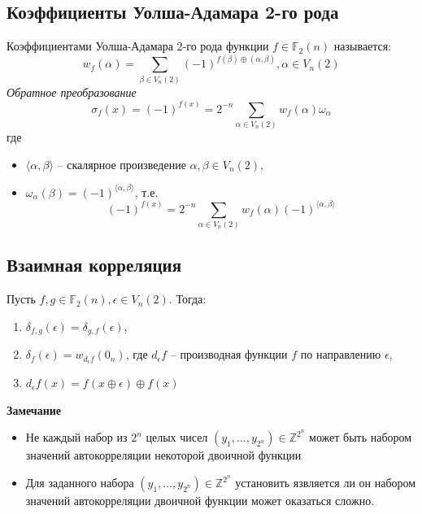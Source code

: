 \documentclass[a4paper,12pt]{article}
\begin{document}
        \subsection{Коэффициенты Уолша-Адамара 2-го рода}
        Коэффициентами Уолша-Адамара 2-го рода функции $f \in
        \mathbb{F}_2(n)$ называется: \[ w_f(\alpha) = \sum_{\beta \in
            V_n(2)} (-1)^{f(\beta) \oplus (\alpha, \beta)},
          \alpha \in V_n(2) \]
        \textit{Обратное преобразование}
        \[ \sigma_f(x) = (-1)^{f(x)} = 2^{-n} \sum_{\alpha \in V_n(2)}
          w_f(\alpha)\omega_{\alpha} \]
        где
        \begin{itemize}
          \item $\langle \alpha, \beta \rangle$ -- скалярное произведение
            $\alpha, \beta \in V_n(2)$,
            \item $\omega_{\alpha}(\beta) = (-1)^{\langle \alpha,
                \beta \rangle}$,
              т.е. \[ (-1)^{f(x)} = 2^{-n} \sum_{\alpha \in V_n(2)}
          w_f(\alpha)(-1)^{\langle \alpha,
            \beta \rangle} \]
        \end{itemize}

        \subsection{Взаимная корреляция}
        Пусть $f, g \in \mathbb{F}_2(n), \epsilon \in V_n(2)$. Тогда:
        \begin{enumerate}
          \item $\delta_{f, g}(\epsilon) = \delta_{g, f}(\epsilon)$,
          \item $\delta_f(\epsilon) = w_{d_{\epsilon}f}(0_n)$, где
            $d_{\epsilon}f$ -- производная функции $f$ по направлению
            $\epsilon$,
          \item $d_{\epsilon}f(x) = f(x \oplus \epsilon) \oplus f(x)$
        \end{enumerate}

        \textbf{Замечание}

        \begin{itemize}
        \item Не каждый набор из $2^n$ целых чисел $(y_1, ...,
          y_{2^n}) \in \mathbb{Z}^{2^n}$ может быть набором значений
          автокорреляции некоторой двоичной функции
        \item Для заданного набора $(y_1, ..., y_{2^n}) \in
          \mathbb{Z}^{2^n}$ установить язвляется ли он набором
          значений автокорреляции двоичной функции может оказаться
          сложно.
        \end{itemize}
\end{document}
